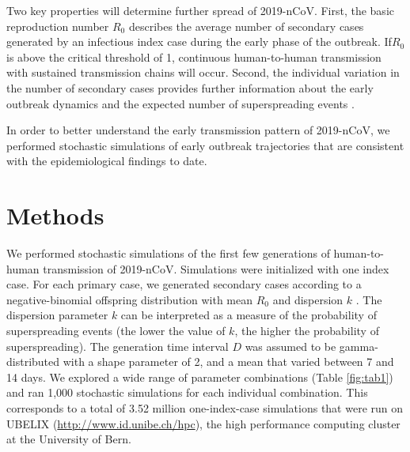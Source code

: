 \documentclass{article}
\begin{document}
Two key properties will determine further spread of 2019-nCoV. First, the basic reproduction number $R_0$ describes the average number of secondary cases generated by an infectious index case during the early phase of the outbreak. If$R_0$ is above the critical threshold of 1, continuous human-to-human transmission with sustained transmission chains will occur. Second, the individual variation in the number of secondary cases provides further information about the early outbreak dynamics and the expected number of superspreading events \cite{Lloyd-Smith:2005,Althaus:2015b,Kucharski:2015b}.

In order to better understand the early transmission pattern of 2019-nCoV, we performed stochastic simulations of early outbreak trajectories that are consistent with the epidemiological findings to date.
%
%
%
%

\section*{Methods}
We performed stochastic simulations of the first few generations of human-to-human transmission of 2019-nCoV. 
Simulations were initialized with one index case.
For each primary case, we generated secondary cases according to a negative-binomial offspring distribution with mean $R_0$ and dispersion $k$ \cite{Lloyd-Smith:2005,Althaus:2015b}.
The dispersion parameter $k$ can be interpreted as a measure of the probability of superspreading events (the lower the value of $k$, the higher the probability of superspreading).
The generation time interval $D$ was assumed to be gamma-distributed with a shape parameter of 2, and a mean that varied between 7 and 14 days.
We explored a wide range of parameter combinations (Table \ref{fig:tab1}) and ran 1,000 stochastic simulations for each individual combination. 
This corresponds to a total of 3.52 million one-index-case simulations that were run on UBELIX (\url{http://www.id.unibe.ch/hpc}), the high performance computing cluster at the University of Bern. 
\end{document}
